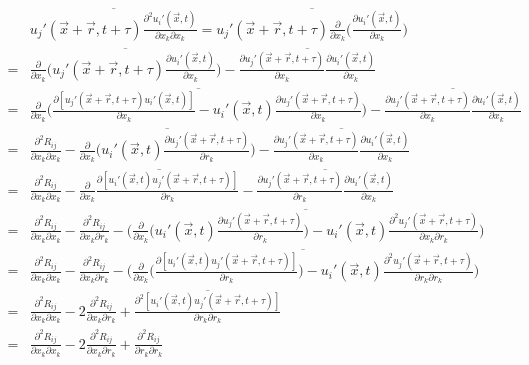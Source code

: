 \documentclass[paper=a4, fontsize=11pt]{scrartcl} %
\numberwithin{equation}{section} %
\numberwithin{figure}{section} %
\numberwithin{table}{section} %
\begin{document}
	\begin{equation}
		\begin{aligned}
			& \overline{u_j'(\vec{x} + \vec{r}, t + \tau) \frac{\partial^2 u_i'(\vec{x}, t)}{\partial x_k \partial x_k}} 
			= \overline{u_j'(\vec{x} + \vec{r}, t + \tau) \frac{\partial}{\partial x_k}\Bigg(\frac{\partial u_i'(\vec{x}, t)}{\partial x_k}\Bigg)}\\
			 = & \overline{\frac{\partial}{\partial x_k} \Bigg(u_j'(\vec{x} + \vec{r}, t + \tau) \frac{\partial u_i'(\vec{x}, t)}{\partial x_k}\Bigg)} - \overline{\frac{\partial u_j'(\vec{x} + \vec{r}, t + \tau)}{\partial x_k} \frac{\partial u_i'(\vec{x}, t)}{\partial x_k}}\\
		= 	& \overline{\frac{\partial}{\partial x_k} \Bigg(\frac{\partial [u_j'(\vec{x} + \vec{r}, t + \tau) u_i'(\vec{x}, t)]}{\partial x_k} - u_i'(\vec{x}, t) \frac{\partial u_j'(\vec{x} + \vec{r}, t + \tau)}{\partial x_k}\Bigg)} - \overline{\frac{\partial u_j'(\vec{x} + \vec{r}, t + \tau)}{\partial x_k} \frac{\partial u_i'(\vec{x}, t)}{\partial x_k}}\\
			 = &\frac{\partial^2 R_{ij}}{\partial x_k \partial x_k} - \overline{\frac{\partial}{\partial x_k} \Bigg(u_i'(\vec{x}, t) \frac{\partial u_j'(\vec{x} + \vec{r}, t + \tau)}{\partial r_k}\Bigg)} - \overline{\frac{\partial u_j'(\vec{x} + \vec{r}, t + \tau)}{\partial x_k} \frac{\partial u_i'(\vec{x}, t)}{\partial x_k}}\\
			 =& \frac{\partial^2 R_{ij}}{\partial x_k \partial x_k} - \overline{\frac{\partial}{\partial x_k} \frac{\partial [u_i'(\vec{x}, t) u_j'(\vec{x} + \vec{r}, t + \tau)]}{\partial r_k}} - \overline{\frac{\partial u_j'(\vec{x} + \vec{r}, t + \tau)}{\partial r_k} \frac{\partial u_i'(\vec{x}, t)}{\partial x_k}}\\
		 =	& \frac{\partial^2 R_{ij}}{\partial x_k \partial x_k} - \frac{\partial^2 R_{ij}}{\partial x_k \partial r_k} - \overline{\Bigg(\frac{\partial}{\partial x_k}\Bigg(u_i'(\vec{x}, t) \frac{\partial u_j'(\vec{x} + \vec{r}, t + \tau)}{\partial r_k} \Bigg) - u_i'(\vec{x}, t) \frac{\partial^2 u_j'(\vec{x} + \vec{r}, t + \tau)}{\partial x_k \partial r_k}\Bigg)}\\
		 = 	&\frac{\partial^2 R_{ij}}{\partial x_k \partial x_k} - \frac{\partial^2 R_{ij}}{\partial x_k \partial r_k} - \overline{\Bigg(\frac{\partial}{\partial x_k}\Bigg(\frac{\partial [u_i'(\vec{x}, t) u_j'(\vec{x} + \vec{r}, t + \tau)]}{\partial r_k} \Bigg) - u_i'(\vec{x}, t) \frac{\partial^2 u_j'(\vec{x} + \vec{r}, t + \tau)}{\partial r_k \partial r_k}\Bigg)}\\
			 = &\frac{\partial^2 R_{ij}}{\partial x_k \partial x_k} - 2\frac{\partial^2 R_{ij}}{\partial x_k \partial r_k} + \overline{\frac{\partial^2 [u_i'(\vec{x}, t)u_j'(\vec{x} + \vec{r}, t + \tau)]}{\partial r_k \partial r_k}}\\
			 =& \frac{\partial^2 R_{ij}}{\partial x_k \partial x_k} - 2\frac{\partial^2 R_{ij}}{\partial x_k \partial r_k} + \frac{\partial^2 R_{ij}}{\partial r_k \partial r_k}\\
		\end{aligned}
	\end{equation}
	
\end{document}
